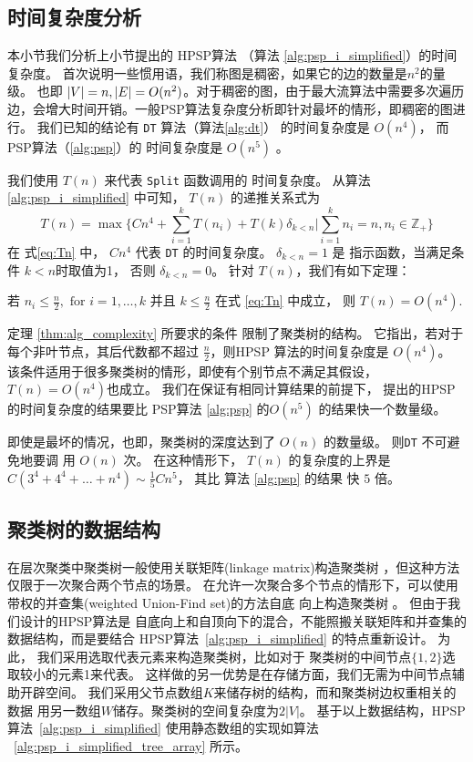 \subsection{时间复杂度分析}

本小节我们分析上小节提出的 HPSP算法 （算法 \ref{alg:psp_i_simplified}）的时间复杂度。
首次说明一些惯用语，我们称图是稠密，如果它的边的数量是$n^2$的量级。
也即 $\lvert V\rvert = n, \lvert E\rvert = O(n^2)$。对于稠密的图，由于最大流算法中需要多次遍历
边，会增大时间开销。一般PSP算法复杂度分析即针对最坏的情形，即稠密的图进行。
我们已知的结论有 \texttt{DT} 算法（算法\ref{alg:dt}）
的时间复杂度是 $O(n^4)$， 而 PSP算法（\ref{alg:psp}）的 
时间复杂度是 $O(n^5)$ \citep{pin}。

我们使用 $T(n)$ 来代表 
\texttt{Split} 函数调用的
时间复杂度。
从算法 \ref{alg:psp_i_simplified} 中可知，
$T(n)$ 的递推关系式为
\begin{equation}\label{eq:Tn}
T(n) = \max \{ C n^4 + \sum_{i=1}^k T(n_i) +
T(k)\delta_{k<n} |
\sum_{i=1}^k n_i = n, n_i \in \mathbb{Z}_{+} \}
\end{equation}
在 式\eqref{eq:Tn} 中，
$Cn^4$ 代表 \texttt{DT} 的时间复杂度。
$\delta_{k<n} = 1$ 是 指示函数，当满足条件 $k<n$时取值为1，
否则 $\delta_{k<n}=0$。
针对 $T(n)$，我们有如下定理：
\begin{theorem}\label{thm:alg_complexity}
	 若 $n_i \leq \frac{n}{2}, \textrm{ for } i=1,\dots,k$ 并且
   $ k \leq \frac{n}{2}$  在式 \eqref{eq:Tn} 中成立， 
   则 $T(n) = O(n^4)$.
\end{theorem}

定理 \ref{thm:alg_complexity} 所要求的条件
限制了聚类树的结构。
它指出，若对于每个非叶节点，其后代数都不超过 $\frac{n}{2}$，则HPSP
算法的时间复杂度是  $O(n^4)$。
该条件适用于很多聚类树的情形，即使有个别节点不满足其假设，$T(n) = O(n^4)$也成立。
我们在保证有相同计算结果的前提下，
提出的HPSP 的时间复杂度的结果要比
PSP算法 \ref{alg:psp} 的$O(n^5)$ 的结果快一个数量级。

即使是最坏的情况，也即，聚类树的深度达到了 $O(n)$ 的数量级。
则\texttt{DT} 不可避免地要调 用 $O(n)$ 次。
在这种情形下，
$T(n)$ 的复杂度的上界是 $C(3^4+4^4 + \dots + n^4) \sim \frac{1}{5}Cn^5$，
其比 算法 \ref{alg:psp} 的结果
快 $5$ 倍。
\subsection{聚类树的数据结构}
在层次聚类中聚类树一般使用关联矩阵(linkage matrix)构造聚类树
\cite{D2011Modern}，但这种方法
仅限于一次聚合两个节点的场景。
在允许一次聚合多个节点的情形下，可以使用带权的并查集(weighted Union-Find set)的方法自底
向上构造聚类树
\cite{chan2020agglomerative}。 
但由于我们设计的HPSP算法是
自底向上和自顶向下的混合，不能照搬关联矩阵和并查集的数据结构，而是要结合
HPSP算法~\ref{alg:psp_i_simplified} 的特点重新设计。
为此，
我们采用选取代表元素来构造聚类树，比如对于
聚类树的中间节点$\{1,2\}$选取较小的元素1来代表。
这样做的另一优势是在存储方面，我们无需为中间节点辅助开辟空间。
我们采用父节点数组$K$来储存树的结构，而和聚类树边权重相关的数据
用另一数组$W$储存。聚类树的空间复杂度为$2|V|$。
基于以上数据结构，HPSP算法~\ref{alg:psp_i_simplified} 
使用静态数组的实现如算法
~\ref{alg:psp_i_simplified_tree_array} 所示。

